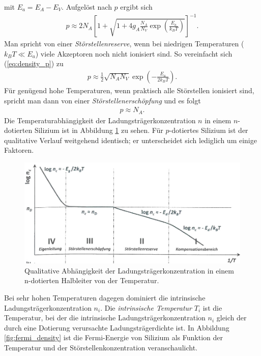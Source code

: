 \documentclass[a4paper,12pt]{article}
\begin{document}
mit $E_a=E_A-E_V$. Aufgelöst nach $p$ ergibt sich
\begin{align}
p\approx 2N_A\left[1+\sqrt{1+4g_A\frac{N_A}{N_V}\exp\left(\frac{E_a}{k_B T}\right)}\right]^{-1}.
\label{eq:density_p}
\end{align}
Man spricht von einer \emph{Störstellenreserve}, wenn bei niedrigen Temperaturen ($k_B T\ll E_a$) viele Akzeptoren noch nicht ionisiert sind. So vereinfacht sich (\ref{eq:density_p}) zu
\begin{align}
p\approx \frac{1}{2}\sqrt{N_A N_V}\exp\left(-\frac{E_a}{2k_B T}\right).
\end{align}
Für genügend hohe Temperaturen, wenn praktisch alle Störstellen ionisiert sind, spricht man dann von einer \emph{Störstellenerschöpfung} und es folgt
\begin{align}
p\approx N_A.
\end{align}
Die Temperaturabhängigkeit der Ladungsträgerkonzentration $n$ in einem $n$-dotierten Silizium ist in Abbildung \ref{fig:si_density_temp} zu sehen. Für $p$-dotiertes Silizium ist der qualitative Verlauf weitgehend identisch; er unterscheidet sich lediglich um einige Faktoren.
\begin{figure}[p]
\centering
\includegraphics[scale=0.6]{Si_density_temp_n.jpeg}
\caption{Qualitative Abhängigkeit der Ladungsträgerkonzentration in einem n-dotierten Halbleiter von der Temperatur. \cite{lit:GroMa14}}
\label{fig:si_density_temp}
\end{figure}
Bei sehr hohen Temperaturen dagegen dominiert die intrinsische Ladungsträgerkonzentration $n_i$. Die \emph{intrinsische Temperatur} $T_i$ ist die Temperatur, bei der die intrinsische Ladungsträgerkonzentration $n_i$ gleich der durch eine Dotierung verursachte Ladungsträgerdichte ist. %
In Abbildung \ref{fig:fermi_density} ist die Fermi-Energie von Silizium als Funktion der Temperatur und der Störstellenkonzentration veranschaulicht.
\end{document}
